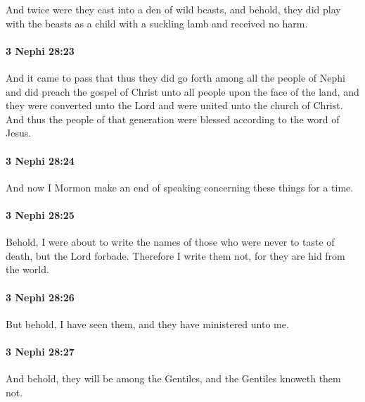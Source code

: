 			And twice were they cast into a den of wild beasts,
			and behold, they did play with the beasts
			as a child with a suckling lamb
			and received no harm.

		\paragraph{3 Nephi 28:23} %
			\label{3NEPHI-28-23}

			And it came to pass that thus they did go forth among all the people of Nephi
			and did preach the gospel of Christ unto all people upon the face of the land,
			and they were converted unto the Lord
			and were united unto the church of Christ.
			And thus the people of that generation were blessed
			according to the word of Jesus.

		\paragraph{3 Nephi 28:24} %
			\label{3NEPHI-28-24}

			And now I Mormon make an end of speaking
			concerning these things for a time.

		\paragraph{3 Nephi 28:25} %
			\label{3NEPHI-28-25}

			Behold, I were about to write the names of those
			who were never to taste of death,
			but the Lord forbade.
			Therefore I write them not,
			for they are hid from the world.

		\paragraph{3 Nephi 28:26} %
			\label{3NEPHI-28-26}

			But behold, I have seen them,
			and they have ministered unto me.

		\paragraph{3 Nephi 28:27} %
			\label{3NEPHI-28-27}

			And behold, they will be among the Gentiles,
			and the Gentiles knoweth them not.

